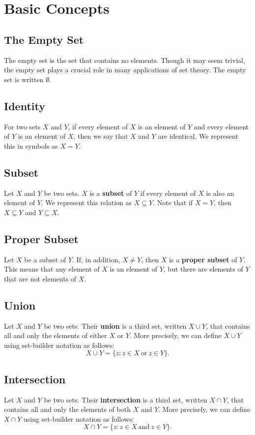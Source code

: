 \documentclass[11pt]{article}
\theoremstyle{definition}
\theoremstyle{remark}
\begin{document}
\section{Basic Concepts}

\subsection{The Empty Set}
The empty set is the set that contains no elements. Though it may seem trivial, the empty set plays a crucial role in many applications of set theory. The empty set is written $\emptyset$.

\subsection{Identity}
For two sets $X$ and $Y$, if every element of $X$ is an element of $Y$ and every element of $Y$ is an element of $X$, then we say that $X$ and $Y$ are identical. We represent this in symbols as $X=Y$.

\subsection{Subset}
Let $X$ and $Y$ be two sets. $X$ is a \textbf{subset} of $Y$ if every element of $X$ is also an element of $Y$. We represent this relation as $X\subseteq Y$. Note that if $X=Y$, then $X\subseteq Y$ and $Y\subseteq X$. 

\subsection{Proper Subset}
Let $X$ be a subset of $Y$. If, in addition, $X\neq Y$, then $X$ is a \textbf{proper subset} of $Y$. This means that any element of $X$ is an element of $Y$, but there are elements of $Y$ that are not elements of $X$. 

\subsection{Union}
Let $X$ and $Y$ be two sets. Their \textbf{union} is a third set, written $X\cup Y$, that contains all and only the elements of either $X$ or $Y$. More precisely, we can define $X\cup Y$ using set-builder notation as follows:
$$X\cup Y = \{z: z\in X \ \text{or} \ z\in Y\}.$$

\subsection{Intersection}
Let $X$ and $Y$ be two sets. Their \textbf{intersection} is a third set, written $X\cap Y$, that contains all and only the elements of both $X$ and $Y$. More precisely, we can define $X\cap Y$ using set-builder notation as follows:
$$X\cap Y = \{z: z\in X \ \text{and} \ z\in Y\}.$$
\end{document}
